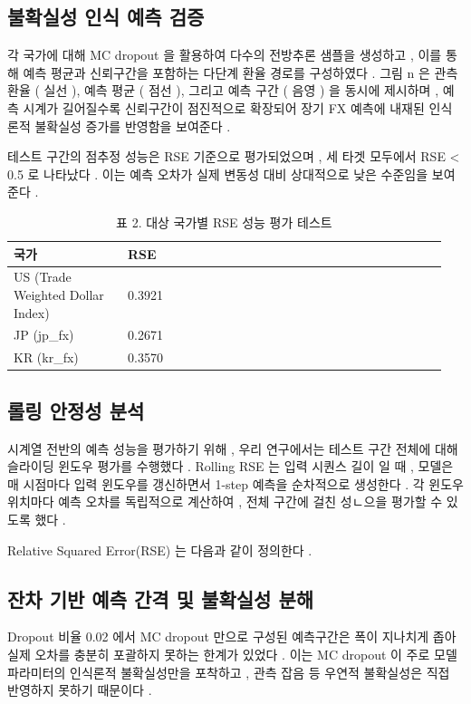 \documentclass[10pt,a4paper]{article}
\begin{document}
\subsection{불확실성 인식 예측 검증}
각 국가에 대해 MC dropout 을 활용하여 다수의 전방추론 샘플을 생성하고 , 이를 통해 예측 평균과 신뢰구간을 포함하는 다단계 환율 경로를 구성하였다 . 그림 n 은 관측 환율 ( 실선 ), 예측 평균 ( 점선 ), 그리고 예측 구간 ( 음영 ) 을 동시에 제시하며 , 예측 시계가 길어질수록 신뢰구간이 점진적으로 확장되어 장기 FX 예측에 내재된 인식론적 불확실성 증가를 반영함을 보여준다 .

테스트 구간의 점추정 성능은 RSE 기준으로 평가되었으며 , 세 타겟 모두에서 RSE < 0.5 로 나타났다 . 이는 예측 오차가 실제 변동성 대비 상대적으로 낮은 수준임을 보여준다 .

\begingroup\small
\begin{table}[t]
\centering
\caption{표 2. 대상 국가별 RSE 성능 평가 테스트}
\begin{tabular}{|p{0.25\linewidth}|p{0.70\linewidth}|}
\hline
 국가 & RSE \\
\hline
 US (Trade Weighted Dollar Index) & 0.3921 \\
\hline
 JP (jp\_fx) & 0.2671 \\
\hline
 KR (kr\_fx) & 0.3570 \\
\hline
\end{tabular}
\end{table}
\endgroup

\subsection{롤링 안정성 분석}
시계열 전반의 예측 성능을 평가하기 위해 , 우리 연구에서는 테스트 구간 전체에 대해 슬라이딩 윈도우 평가를 수행했다 . Rolling RSE 는 입력 시퀀스 길이 일 때 , 모델은 매 시점마다 입력 윈도우를 갱신하면서 1-step 예측을 순차적으로 생성한다 . 각 윈도우 위치마다 예측 오차를 독립적으로 계산하여 , 전체 구간에 걸친 성ㄴ으을 평가할 수 있도록 했다 .

Relative Squared Error(RSE) 는 다음과 같이 정의한다 .

\subsection{잔차 기반 예측 간격 및 불확실성 분해}
Dropout 비율 0.02 에서 MC dropout 만으로 구성된 예측구간은 폭이 지나치게 좁아 실제 오차를 충분히 포괄하지 못하는 한계가 있었다 . 이는 MC dropout 이 주로 모델 파라미터의 인식론적 불확실성만을 포착하고 , 관측 잡음 등 우연적 불확실성은 직접 반영하지 못하기 때문이다 .
\end{document}

